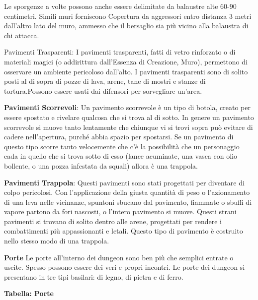 \documentclass[a4paper,11pt,twoside,openany]{book}
\begin{document}
Le sporgenze a volte possono anche essere delimitate da balaustre alte 60-90 centimetri. Simili muri forniscono Copertura da aggressori entro distanza 3 metri dall'altro lato del muro, ammesso che il bersaglio sia più vicino alla balaustra di chi attacca.

Pavimenti Trasparenti: I pavimenti trasparenti, fatti di vetro rinforzato o di materiali magici (o addirittura dall'Essenza di Creazione, Muro), permettono di osservare un ambiente pericoloso dall'alto. I pavimenti trasparenti sono di solito posti al di sopra di pozze di lava, arene, tane di mostri e stanze di tortura.Possono essere usati dai difensori
per sorvegliare un'area.

\textbf{Pavimenti Scorrevoli}: Un pavimento scorrevole è un tipo di botola, creato per essere spostato e rivelare qualcosa che si trova al di sotto. In genere un pavimento scorrevole si muove tanto lentamente che chiunque vi si trovi sopra può evitare di cadere nell'apertura, purché abbia spazio per spostarsi. Se un pavimento di questo tipo scorre tanto velocemente che c'è la possibilità che un personaggio cada in quello che si trova sotto di esso (lance acuminate, una vasca con olio bollente, o una pozza infestata da squali) allora è una trappola.

\textbf{Pavimenti Trappola}: Questi pavimenti sono stati progettati per diventare di colpo pericolosi. Con l'applicazione della giusta quantità di peso o l'azionamento di una leva nelle vicinanze, spuntoni sbucano dal pavimento, fiammate o sbuffi di vapore partono da fori nascosti, o l'intero pavimento si muove. Questi strani pavimenti si trovano di solito dentro alle arene, progettati per rendere i combattimenti più appassionanti e letali. Questo tipo di pavimento è costruito nello stesso modo di una trappola.

\textbf{Porte} Le porte all'interno dei dungeon sono ben più che semplici entrate o uscite. Spesso possono essere dei veri e propri incontri. Le porte dei dungeon si presentano in tre tipi basilari: di legno, di pietra e di ferro.

\bigskip

\textbf{Tabella: Porte}

\bigskip
\end{document}

